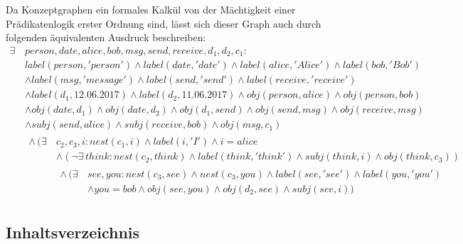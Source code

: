 \documentclass[11pt, a4paper]{scrreprt}
\begin{document}
Da Konzeptgraphen ein formales Kalkül von der Mächtigkeit einer Prädikatenlogik erster Ordnung sind, lässt sich dieser Graph auch durch folgenden äquivalenten Ausdruck beschreiben:
\begin{align*}
	\exists\,& person, date, alice, bob, msg, send, receive, d_1, d_2, c_1:\\
	& label(person, 'person') \land label(date, 'date') \land label(alice, 'Alice') \land label(bob, 'Bob')\\
	& \land label(msg, 'message') \land label(send, 'send') \land label(receive, 'receive')\\
	& \land label(d_1, 12.06.2017) \land label(d_2, 11.06.2017) \land obj(person, alice) \land obj(person, bob)\\
	& \land obj(date, d_1) \land obj(date, d_2) \land obj(d_1, send) \land obj(send, msg) \land obj(receive, msg)\\
	& \land subj(send, alice) \land subj(receive, bob) \land obj(msg, c_1)\\
	& \begin{aligned}
		\land\, (\exists\,& c_2, c_3, i: nest(c_1, i) \land label(i, 'I') \land i = alice\\
		& \land (\lnot \exists\, think: nest(c_2, think) \land label(think, 'think') \land subj(think, i) \land obj(think, c_3))\\
		& \begin{aligned}
			\land\, (\exists\,& see, you: nest(c_3, see) \land nest(c_3, you) \land label(see, 'see') \land label(you, 'you')\\
			& \land you = bob \land obj(see, you) \land obj(d_2, see) \land subj(see, i))
		\end{aligned}
	\end{aligned}
\end{align*}

\pagebreak

\subsection{Inhaltsverzeichnis}
\end{document}
